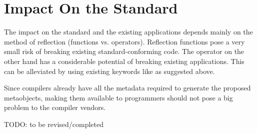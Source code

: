 \section{Impact On the Standard}
\label{section-impact}

The impact on the standard and the existing applications depends
mainly on the method of reflection (functions vs. operators).
Reflection functions pose a very small risk of breaking existing
standard-conforming code. The \verb@mirrored@ operator on the other
hand has a considerable potential of breaking existing applications.
This can be alleviated by using existing keywords like \verb@%@
as suggested above.

Since compilers already have all the metadata required to generate
the proposed metaobjects, making them available to programmers
should not pose a big problem to the compiler vendors.

TODO: to be revised/completed
